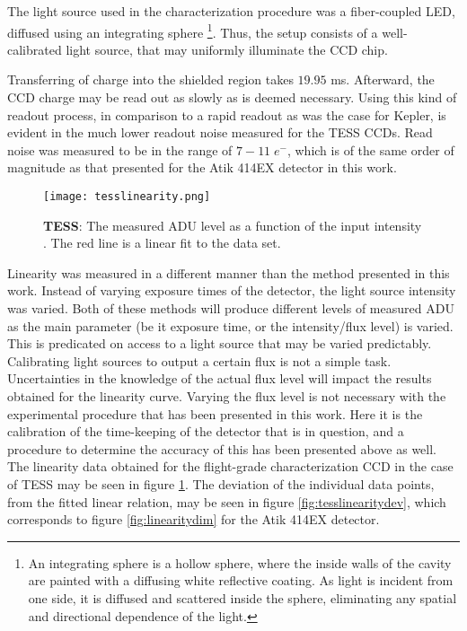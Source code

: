 \documentclass[../main.tex]{subfiles}
\begin{document}
The light source used in the characterization procedure was a fiber-coupled LED, diffused using an integrating sphere \footnote{An integrating sphere is a hollow sphere, where the inside walls of the cavity are painted with a diffusing white reflective coating. As light is incident from one side, it is diffused and scattered inside the sphere, eliminating any spatial and directional dependence of the light.}. Thus, the setup consists of a well-calibrated light source, that may uniformly illuminate the CCD chip. 

Transferring of charge into the shielded region takes  $19.95$ ms\cite{tessinstrumenthandbook}. Afterward, the CCD charge may be read out as slowly as is deemed necessary. Using this kind of readout process, in comparison to a rapid readout as was the case for Kepler, is evident in the much lower readout noise measured for the TESS CCDs. Read noise was measured to be in the range of $7-11 \;e^-$, which is of the same order of magnitude as that presented for the Atik 414EX detector in this work. 

\begin{figure}
	\centering
	\texttt{[image: tesslinearity.png]}
	\caption{\textbf{TESS}: 	The measured ADU level as a function of the input intensity \cite{tesscharacterization}. The red line is a linear fit to the data set.}
	\label{fig:tesslinearity}
\end{figure}

Linearity was measured in a different manner than the method presented in this work. Instead of varying exposure times of the detector, the light source intensity was varied. Both of these methods will produce different levels of measured ADU as the main parameter (be it exposure time, or the intensity/flux level) is varied. This is predicated on access to a light source that may be varied predictably. Calibrating light sources to output a certain flux is not a simple task. Uncertainties in the knowledge of the actual flux level will impact the results obtained for the linearity curve. Varying the flux level is not necessary with the experimental procedure that has been presented in this work. Here it is the calibration of the time-keeping of the detector that is in question, and a procedure to determine the accuracy of this has been presented above as well. The linearity data obtained for the flight-grade characterization CCD in the case of TESS may be seen in figure \ref{fig:tesslinearity}. The deviation of the individual data points, from the fitted linear relation, may be seen in figure \ref{fig:tesslinearitydev}, which corresponds to figure \ref{fig:linearitydim} for the Atik 414EX detector.
\end{document}
